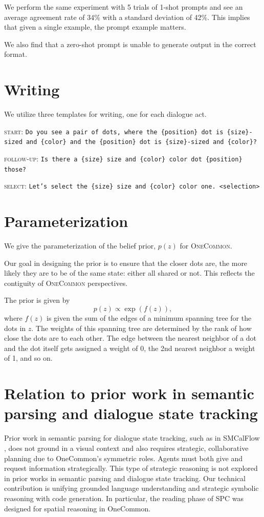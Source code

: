 \documentclass[11pt]{article}
\begin{document}
We perform the same experiment with 5 trials of 1-shot prompts and see an average agreement rate of 34\% with a standard deviation of 42\%. This implies that given a single example, the prompt example matters.

We also find that a zero-shot prompt is unable to generate output in the correct format.

\section{Writing}
\label{sec:templates}
We utilize three templates for writing, one for each dialogue act.

\noindent\textsc{start}: \texttt{Do you see a pair of dots, where the \{position\} dot is \{size\}-sized and \{color\} and the \{position\} dot is \{size\}-sized and \{color\}?}

\noindent\textsc{follow-up}: \texttt{Is there a \{size\} size and \{color\} color dot \{position\} those?}

\noindent\textsc{select}: \texttt{Let's select the \{size\} size and \{color\} color one. <selection>}

\section{Parameterization}
\label{sec:parameterization}
We give the parameterization of the belief prior, $p(z)$ for \textsc{OneCommon}.

Our goal in designing the prior is to ensure that the closer dots are, the more likely they are to be of the same state: either all shared or not.
This reflects the contiguity of \textsc{OneCommon} perspectives.

The prior is given by
\begin{equation}
p(z) \propto \exp(f(z)),
\end{equation}
where $f(z)$ is given the sum of the edges of a minimum spanning tree for the dots in $z$. The weights of this spanning tree are determined by the rank of how close the dots are to each other.
The edge between the nearest neighbor of a dot and the dot itself gets assigned a weight of 0, the 2nd nearest neighbor a weight of 1, and so on.

\section{Relation to prior work in semantic parsing and dialogue state tracking}
Prior work in semantic parsing for dialogue state tracking, such as in SMCalFlow \citep{sm}, does not ground in a visual context and also requires strategic, collaborative planning due to OneCommon’s symmetric roles. Agents must both give and request information strategically. This type of strategic reasoning is not explored in prior works in semantic parsing and dialogue state tracking.
Our technical contribution is unifying grounded language understanding and strategic symbolic reasoning with code generation. In particular, the reading phase of SPC was designed for spatial reasoning in OneCommon. 
\end{document}
